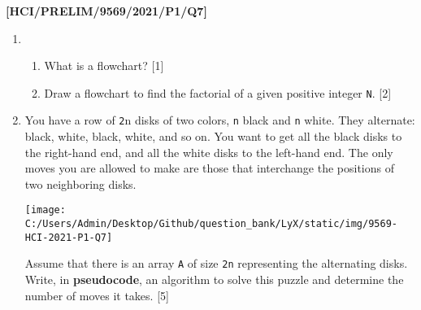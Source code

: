 \item \textbf{{[}HCI/PRELIM/9569/2021/P1/Q7{]}}
\begin{enumerate}
\item {}
\begin{enumerate}
\item What is a flowchart? \hfill{}{[}1{]}
\item Draw a flowchart to find the factorial of a given positive integer
\texttt{N}.\hfill{} {[}2{]}
\end{enumerate}
\item You have a row of \texttt{2}n disks of two colors, \texttt{n} black
and \texttt{n} white. They alternate: black, white, black, white,
and so on. You want to get all the black disks to the right-hand end,
and all the white disks to the left-hand end. The only moves you are
allowed to make are those that interchange the positions of two neighboring
disks.
\begin{center}
\texttt{[image: C:/Users/Admin/Desktop/Github/question\_bank/LyX/static/img/9569-HCI-2021-P1-Q7]}
\par\end{center}

Assume that there is an array \texttt{A} of size \texttt{2n} representing
the alternating disks. Write, in \textbf{pseudocode}, an algorithm
to solve this puzzle and determine the number of moves it takes. \hfill{}{[}5{]}
\end{enumerate}